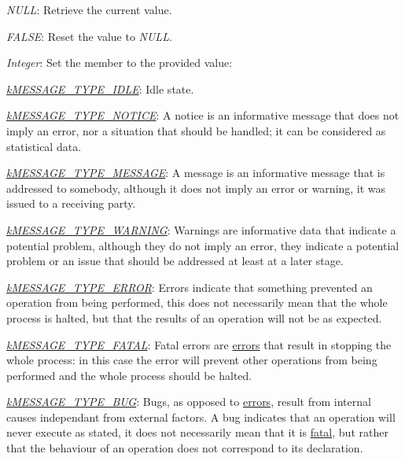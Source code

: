 \begin{DoxyItemize}
\item {\itshape N\-U\-L\-L\/}\-: Retrieve the current value. 
\item {\itshape F\-A\-L\-S\-E\/}\-: Reset the value to {\itshape N\-U\-L\-L\/}. 
\item {\itshape Integer\/}\-: Set the member to the provided value\-: 
\begin{DoxyItemize}
\item {\itshape \hyperlink{}{k\-M\-E\-S\-S\-A\-G\-E\-\_\-\-T\-Y\-P\-E\-\_\-\-I\-D\-L\-E}\/}\-: Idle state. 
\item {\itshape \hyperlink{}{k\-M\-E\-S\-S\-A\-G\-E\-\_\-\-T\-Y\-P\-E\-\_\-\-N\-O\-T\-I\-C\-E}\/}\-: A notice is an informative message that does not imply an error, nor a situation that should be handled; it can be considered as statistical data. 
\item {\itshape \hyperlink{}{k\-M\-E\-S\-S\-A\-G\-E\-\_\-\-T\-Y\-P\-E\-\_\-\-M\-E\-S\-S\-A\-G\-E}\/}\-: A message is an informative message that is addressed to somebody, although it does not imply an error or warning, it was issued to a receiving party. 
\item {\itshape \hyperlink{}{k\-M\-E\-S\-S\-A\-G\-E\-\_\-\-T\-Y\-P\-E\-\_\-\-W\-A\-R\-N\-I\-N\-G}\/}\-: Warnings are informative data that indicate a potential problem, although they do not imply an error, they indicate a potential problem or an issue that should be addressed at least at a later stage. 
\item {\itshape \hyperlink{}{k\-M\-E\-S\-S\-A\-G\-E\-\_\-\-T\-Y\-P\-E\-\_\-\-E\-R\-R\-O\-R}\/}\-: Errors indicate that something prevented an operation from being performed, this does not necessarily mean that the whole process is halted, but that the results of an operation will not be as expected. 
\item {\itshape \hyperlink{}{k\-M\-E\-S\-S\-A\-G\-E\-\_\-\-T\-Y\-P\-E\-\_\-\-F\-A\-T\-A\-L}\/}\-: Fatal errors are \hyperlink{}{errors} that result in stopping the whole process\-: in this case the error will prevent other operations from being performed and the whole process should be halted. 
\item {\itshape \hyperlink{}{k\-M\-E\-S\-S\-A\-G\-E\-\_\-\-T\-Y\-P\-E\-\_\-\-B\-U\-G}\/}\-: Bugs, as opposed to \hyperlink{}{errors}, result from internal causes independant from external factors. A bug indicates that an operation will never execute as stated, it does not necessarily mean that it is \hyperlink{}{fatal}, but rather that the behaviour of an operation does not correspond to its declaration. 
\end{DoxyItemize}
\end{DoxyItemize}

